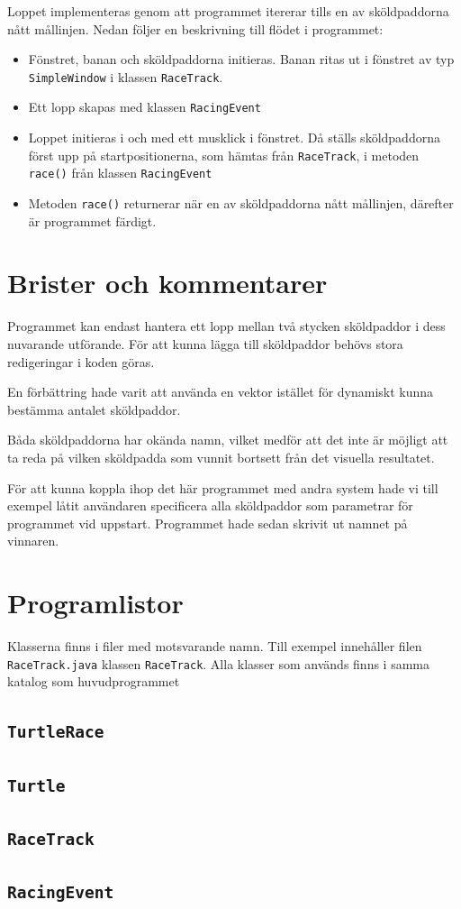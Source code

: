 \documentclass[a4paper]{article}
\newcommand{\code}[1]{\texttt{#1}} %
\begin{document}
\vspace{\baselineskip}
Loppet implementeras genom att programmet itererar tills en av sköldpaddorna nått mållinjen.
Nedan följer en beskrivning till flödet i programmet:

\begin{itemize}
\item Fönstret, banan och sköldpaddorna initieras. Banan ritas ut i fönstret av typ \code{SimpleWindow} i klassen \code{RaceTrack}.
\item Ett lopp skapas med klassen \code{RacingEvent}
\item Loppet initieras i och med ett musklick i fönstret. Då ställs sköldpaddorna först upp på startpositionerna, som hämtas från \code{RaceTrack},  i metoden \code{race()} från klassen \code{RacingEvent}
\item Metoden \code{race()} returnerar när en av sköldpaddorna nått mållinjen, därefter är programmet färdigt. 
\end{itemize}

\section{Brister och kommentarer}
Programmet kan endast hantera ett lopp mellan två stycken sköldpaddor i dess nuvarande utförande. För att kunna lägga till sköldpaddor behövs stora redigeringar i koden göras.

En förbättring hade varit att använda en vektor istället för dynamiskt kunna bestämma antalet sköldpaddor.

Båda sköldpaddorna har okända namn, vilket medför att det inte är möjligt att ta reda på vilken sköldpadda som vunnit bortsett från det visuella resultatet. 

För att kunna koppla ihop det här programmet med andra system hade vi till exempel låtit användaren specificera alla sköldpaddor som parametrar för programmet vid uppstart. Programmet hade sedan skrivit ut namnet på vinnaren.


\section{Programlistor}
Klasserna finns i filer med motsvarande namn. Till exempel innehåller filen  \code{RaceTrack.java} klassen \code{RaceTrack}. Alla klasser som används finns i samma katalog som huvudprogrammet

\subsection{\code{TurtleRace}}


\subsection{\code{Turtle}}

\subsection{\code{RaceTrack}}

\subsection{\code{RacingEvent}}
\end{document}

